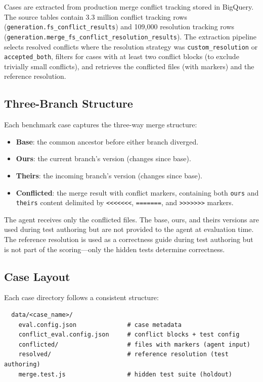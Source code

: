 \documentclass[11pt,letterpaper]{article}
\begin{document}
Cases are extracted from production merge conflict tracking stored in BigQuery. The source tables contain 3.3 million conflict tracking rows (\texttt{generation.fs\_conflict\_results}) and 109{,}000 resolution tracking rows (\texttt{generation.merge\_fs\_conflict\_resolution\_results}). The extraction pipeline selects resolved conflicts where the resolution strategy was \texttt{custom\_resolution} or \texttt{accepted\_both}, filters for cases with at least two conflict blocks (to exclude trivially small conflicts), and retrieves the conflicted files (with markers) and the reference resolution.

\subsection{Three-Branch Structure}

Each benchmark case captures the three-way merge structure:

\begin{itemize}[leftmargin=2em]
\item \textbf{Base}: the common ancestor before either branch diverged.
\item \textbf{Ours}: the current branch's version (changes since base).
\item \textbf{Theirs}: the incoming branch's version (changes since base).
\item \textbf{Conflicted}: the merge result with conflict markers, containing both \texttt{ours} and \texttt{theirs} content delimited by \texttt{<{}<{}<{}<{}<{}<{}<}, \texttt{=======}, and \texttt{>{}>{}>{}>{}>{}>{}>{}} markers.
\end{itemize}

The agent receives only the conflicted files. The base, ours, and theirs versions are used during test authoring but are not provided to the agent at evaluation time. The reference resolution is used as a correctness guide during test authoring but is not part of the scoring---only the hidden tests determine correctness.

\subsection{Case Layout}

Each case directory follows a consistent structure:

\begin{verbatim}
  data/<case_name>/
    eval.config.json              # case metadata
    conflict_eval.config.json     # conflict blocks + test config
    conflicted/                   # files with markers (agent input)
    resolved/                     # reference resolution (test authoring)
    merge.test.js                 # hidden test suite (holdout)
\end{verbatim}
\end{document}
